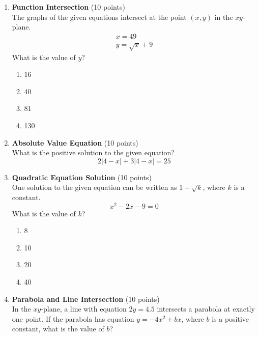 \begin{enumerate}
  \item \textbf{Function Intersection} (10 points)\\
  The graphs of the given equations intersect at the point $(x, y)$ in the $xy$-plane.
  \[
  \begin{gathered}
  x=49 \\
  y=\sqrt{x}+9
  \end{gathered}
  \]
  What is the value of $y$?
  \begin{enumerate}[label=(\Alph*)]
    \item 16
    \item 40
    \item 81
    \item 130
  \end{enumerate}
  \begin{subanswer}
  \end{subanswer}

  \item \textbf{Absolute Value Equation} (10 points)\\
  What is the positive solution to the given equation?
  \[
  2|4-x|+3|4-x|=25
  \]
  \begin{subanswer}
  \end{subanswer}

  \item \textbf{Quadratic Equation Solution} (10 points)\\
  One solution to the given equation can be written as $1+\sqrt{k}$, where $k$ is a constant.
  \[
  x^{2}-2 x-9=0
  \]
  What is the value of $k$?
  \begin{enumerate}[label=(\Alph*)]
    \item 8
    \item 10
    \item 20
    \item 40
  \end{enumerate}
  \begin{subanswer}
  \end{subanswer}

  \item \textbf{Parabola and Line Intersection} (10 points)\\
  In the $xy$-plane, a line with equation $2 y=4.5$ intersects a parabola at exactly one point. If the parabola has equation $y=-4 x^{2}+b x$, where $b$ is a positive constant, what is the value of $b$?
  \begin{subanswer}
  \end{subanswer}


\end{enumerate}
